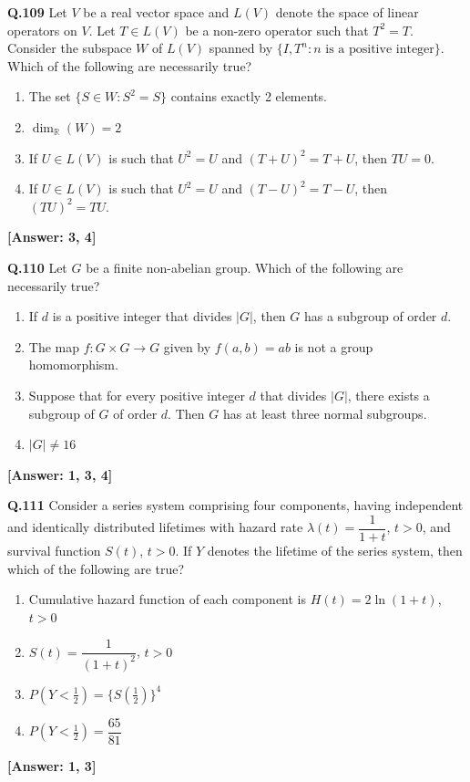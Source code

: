 \documentclass[12pt,a4paper]{article}
\newcommand{\ans}[1]{\quad\textcolor{anscolor}{\textbf{[Answer: #1]}}}
\begin{document}
\textbf{Q.109} Let $V$ be a real vector space and $L(V)$ denote the space of linear operators on $V$. Let $T\in L(V)$ be a non-zero operator such that $T^2=T$. Consider the subspace $W$ of $L(V)$ spanned by $\{I,T^n:n\text{ is a positive integer}\}$. Which of the following are necessarily true?
\begin{enumerate}[label=\arabic*.]
\item The set $\{S\in W:S^2=S\}$ contains exactly 2 elements.
\item $\dim_\mathbb{R}(W)=2$
\item If $U\in L(V)$ is such that $U^2=U$ and $(T+U)^2=T+U$, then $TU=0$.
\item If $U\in L(V)$ is such that $U^2=U$ and $(T-U)^2=T-U$, then $(TU)^2=TU$.
\end{enumerate}\ans{3, 4}

\textbf{Q.110} Let $G$ be a finite non-abelian group. Which of the following are necessarily true?
\begin{enumerate}[label=\arabic*.]
\item If $d$ is a positive integer that divides $|G|$, then $G$ has a subgroup of order $d$.
\item The map $f:G\times G\to G$ given by $f(a,b)=ab$ is not a group homomorphism.
\item Suppose that for every positive integer $d$ that divides $|G|$, there exists a subgroup of $G$ of order $d$. Then $G$ has at least three normal subgroups.
\item $|G|\neq16$
\end{enumerate}\ans{1, 3, 4}

\textbf{Q.111} Consider a series system comprising four components, having independent and identically distributed lifetimes with hazard rate $\lambda(t)=\dfrac{1}{1+t}$, $t>0$, and survival function $S(t)$, $t>0$. If $Y$ denotes the lifetime of the series system, then which of the following are true?
\begin{enumerate}[label=\arabic*.]
\item Cumulative hazard function of each component is $H(t)=2\ln(1+t)$, $t>0$
\item $S(t)=\dfrac{1}{(1+t)^2}$, $t>0$
\item $P(Y<\tfrac{1}{2})=\bigl\{S(\tfrac{1}{2})\bigr\}^4$
\item $P(Y<\tfrac{1}{2})=\dfrac{65}{81}$
\end{enumerate}\ans{1, 3}
\end{document}
